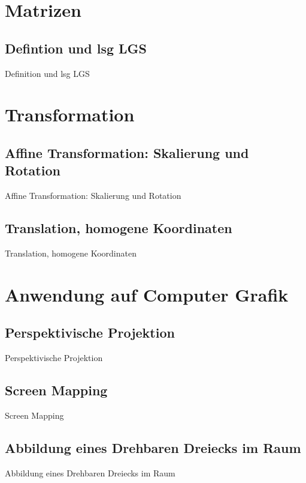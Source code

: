 \documentclass[10pt,aspectratio=169]{beamer}
\begin{document}
  \section{Matrizen}

  \subsection{Defintion und lsg LGS}
  \begin{frame}{Definition und lsg LGS}
  \end{frame}

  \section{Transformation}

  \subsection{Affine Transformation: Skalierung und Rotation}
  \begin{frame}{Affine Transformation: Skalierung und Rotation}
  \end{frame}

  \subsection{Translation, homogene Koordinaten}
  \begin{frame}{Translation, homogene Koordinaten}
  \end{frame}

  \section{Anwendung auf Computer Grafik}


  \subsection{Perspektivische Projektion}
  \begin{frame}{Perspektivische Projektion}
  \end{frame}


  \subsection{Screen Mapping}
  \begin{frame}{Screen Mapping}
  \end{frame}

  \subsection{Abbildung eines Drehbaren Dreiecks im Raum}
  \begin{frame}{Abbildung eines Drehbaren Dreiecks im Raum}
  \end{frame}
\end{document}
